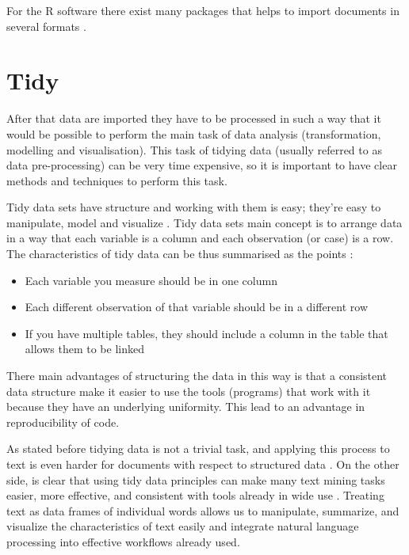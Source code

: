 \documentclass[]{book}
\providecommand{\tightlist}{%
  \setlength{\itemsep}{0pt}\setlength{\parskip}{0pt}}
\theoremstyle{definition}
\theoremstyle{definition}
\theoremstyle{definition}
\theoremstyle{remark}
\begin{document}
For the R software there exist many packages that helps to import
documents in several formats \citep{readr2017r}.

\section{Tidy}\label{sotatoolstidy}

After that data are imported they have to be processed in such a way
that it would be possible to perform the main task of data analysis
(transformation, modelling and visualisation). This task of tidying data
(usually referred to as data pre-processing) can be very time expensive,
so it is important to have clear methods and techniques to perform this
task.

Tidy data sets have structure and working with them is easy; they're
easy to manipulate, model and visualize \citep{wickham2014tidy}. Tidy
data sets main concept is to arrange data in a way that each variable is
a column and each observation (or case) is a row. The characteristics of
tidy data can be thus summarised as the points \citep{leek2015elements}:

\begin{itemize}
\tightlist
\item
  Each variable you measure should be in one column
\item
  Each different observation of that variable should be in a different
  row
\item
  If you have multiple tables, they should include a column in the table
  that allows them to be linked
\end{itemize}

There main advantages of structuring the data in this way is that a
consistent data structure make it easier to use the tools (programs)
that work with it because they have an underlying uniformity. This lead
to an advantage in reproducibility of code.

As stated before tidying data is not a trivial task, and applying this
process to text is even harder for documents with respect to structured
data \citep{silge2016tidytext}. On the other side, is clear that using
tidy data principles can make many text mining tasks easier, more
effective, and consistent with tools already in wide use . Treating text
as data frames of individual words allows us to manipulate, summarize,
and visualize the characteristics of text easily and integrate natural
language processing into effective workflows already used.
\end{document}
